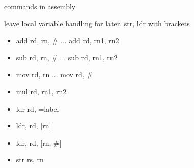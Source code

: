 \begin{frame}{commands in assembly}

	leave local variable handling for later. str, ldr with brackets

	\begin{itemize}
		\item add rd, rn, \# ... add rd, rn1, rn2
		\item sub rd, rn, \# ... sub rd, rn1, rn2
		\item mov rd, rn ... mov rd, \#
		\item mul rd, rn1, rn2
		\item ldr rd, =label
		\item ldr, rd, [rn]
		\item ldr, rd, [rn, #]
		\item str rs, rn
	\end{itemize}

\end{frame}














